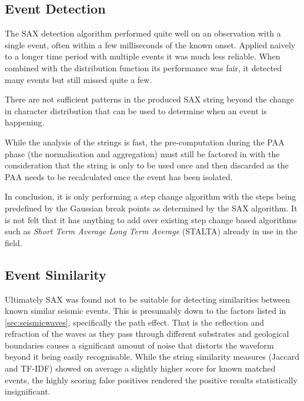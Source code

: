 \documentclass[../report.tex]{subfiles}
\begin{document}
\subsection{Event Detection}

	The SAX detection algorithm performed quite well on an observation with a single event, often within a few milliseconds of the known onset.  Applied naively to a longer time period with multiple events it was much less reliable.  When combined with the distribution function its performance was fair, it detected many events but still missed quite a few.
	
	There are not sufficient patterns in the produced SAX string beyond the change in character distribution that can be used to determine when an event is happening.
	
	While the analysis of the strings is fast, the pre-computation during the PAA phase (the normalisation and aggregation) must still be factored in with the consideration that the string is only to be used once and then discarded as the PAA needs to be recalculated once the event has been isolated.
	
	In conclusion, it is only performing a step change algorithm with the steps being predefined by the Gaussian break points as determined by the SAX algorithm.  It is not felt that it has anything to add over existing step change based algorithms such as \textit{Short Term Average Long Term Average} (STALTA) already in use in the field.


\subsection{Event Similarity}

	Ultimately SAX was found not to be suitable for detecting similarities between known similar seismic events.  This is presumably down to the factors listed in \cref{sec:seismicwaves}, specifically the path effect.  That is the reflection and refraction of the waves as they pass through different substrates and geological boundaries causes a significant amount of noise that distorts the waveform beyond it being easily recognisable.  While the string similarity measures (Jaccard and TF-IDF) showed on average a slightly higher score for known matched events, the highly scoring false positives rendered the positive results statistically insignificant.
	
\end{document}
